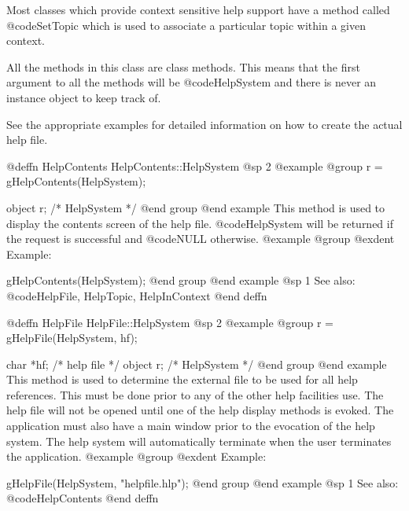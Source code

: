 Most classes which provide context sensitive help support have a method
called @code{SetTopic} which is used to associate a particular topic
within a given context.

All the methods in this class are class methods.  This means that
the first argument to all the methods will be @code{HelpSystem} and
there is never an instance object to keep track of.

See the appropriate examples for detailed information on how to
create the actual help file.











@deffn {HelpContents} HelpContents::HelpSystem
@sp 2
@example
@group
r = gHelpContents(HelpSystem);

object  r;      /*  HelpSystem  */
@end group
@end example
This method is used to display the contents screen of the help file.
@code{HelpSystem} will be returned if the request is successful and
@code{NULL} otherwise.
@example
@group
@exdent Example:

gHelpContents(HelpSystem);
@end group
@end example
@sp 1
See also:  @code{HelpFile, HelpTopic, HelpInContext}
@end deffn















@deffn {HelpFile} HelpFile::HelpSystem
@sp 2
@example
@group
r = gHelpFile(HelpSystem, hf);

char    *hf;    /*  help file   */
object  r;      /*  HelpSystem  */
@end group
@end example
This method is used to determine the external file to be used for all help
references.  This must be done prior to any of the other help facilities
use.  The help file will not be opened until one of the help display
methods is evoked.  The application must also have a main window prior
to the evocation of the help system.  The help system will automatically
terminate when the user terminates the application.
@example
@group
@exdent Example:

gHelpFile(HelpSystem, "helpfile.hlp");
@end group
@end example
@sp 1
See also:  @code{HelpContents}
@end deffn














